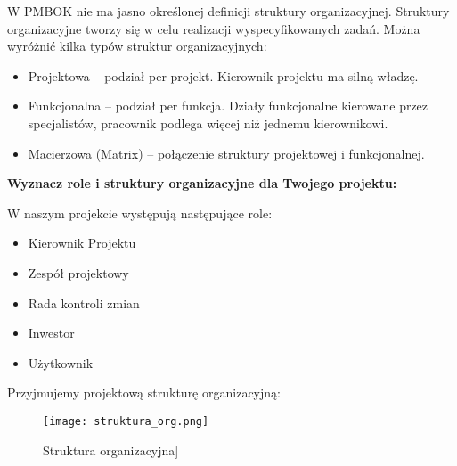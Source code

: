 W PMBOK nie ma jasno określonej definicji struktury organizacyjnej. Struktury organizacyjne tworzy się w celu realizacji wyspecyfikowanych zadań. Można wyróżnić kilka typów struktur organizacyjnych:
\begin{itemize}
\item	Projektowa – podział per projekt. Kierownik projektu ma silną władzę. 
\item	Funkcjonalna – podział per funkcja. Działy funkcjonalne kierowane przez specjalistów, pracownik podlega więcej niż jednemu kierownikowi.
\item	Macierzowa (Matrix) – połączenie struktury projektowej i funkcjonalnej.
\end{itemize}


\textbf{Wyznacz role i struktury organizacyjne dla Twojego projektu:}


W naszym projekcie występują następujące role:
\begin{itemize}
\item Kierownik Projektu
\item Zespół projektowy
\item Rada kontroli zmian
\item Inwestor
\item Użytkownik
\end{itemize}


Przyjmujemy projektową strukturę organizacyjną:
\begin{figure}[h]
\begin{center}
\texttt{[image: struktura\_org.png]}
\caption[Struktura organizacyjna]{Struktura organizacyjna]}
\label{rysunekProces}
\end{center}
\end{figure}




